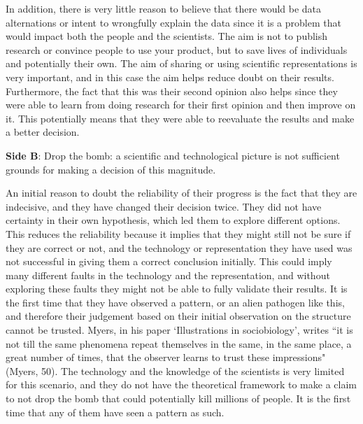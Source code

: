 \documentclass[11pt, oneside]{article}
\begin{document}
\par In addition, there is very little reason to believe that there would be data alternations or intent to wrongfully explain the data since it is a problem that would impact both the people and the scientists. The aim is not to publish research or convince people to use your product, but to save lives of individuals and potentially their own. The aim of sharing or using scientific representations is very important, and in this case the aim helps reduce doubt on their results. Furthermore, the fact that this was their second opinion also helps since they were able to learn from doing research for their first opinion and then improve on it. This potentially means that they were able to reevaluate the results and make a better decision.


\newpage


\noindent \textbf{Side B}: Drop the bomb: a scientific and technological picture is not sufficient grounds for making a decision of this magnitude.


\par An initial reason to doubt the reliability of their progress is the fact that they are indecisive, and they have changed their decision twice. They did not have certainty in their own hypothesis, which led them to explore different options. This reduces the reliability because it implies that they might still not be sure if they are correct or not, and the technology or representation they have used was not successful in giving them a correct conclusion initially. This could imply many different faults in the technology and the representation, and without exploring these faults they might not be able to fully validate their results.
It is the first time that they have observed a pattern, or an alien pathogen like this, and therefore their judgement based on their initial observation on the structure cannot be trusted. Myers, in his paper `Illustrations in sociobiology', writes ``it is not till the same phenomena repeat themselves in the same, in the same place, a great number of times, that the observer learns to trust these impressions" (Myers, 50). The technology and the knowledge of the scientists is very limited for this scenario, and they do not have the theoretical framework to make a claim to not drop the bomb that could potentially kill millions of people. It is the first time that any of them have seen a pattern as such.
\end{document}
